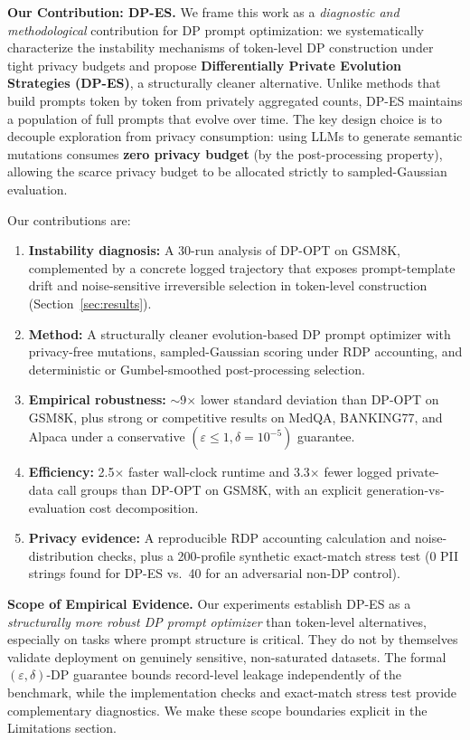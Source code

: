




\noindent\textbf{Our Contribution: DP-ES.}
We frame this work as a \emph{diagnostic and methodological} contribution for DP prompt optimization: we systematically characterize the instability mechanisms of token-level DP construction under tight privacy budgets and propose \textbf{Differentially Private Evolution Strategies (DP-ES)}, a structurally cleaner alternative. Unlike methods that build prompts token by token from privately aggregated counts, DP-ES maintains a population of full prompts that evolve over time. The key design choice is to decouple exploration from privacy consumption: using LLMs to generate semantic mutations consumes \textbf{zero privacy budget} (by the post-processing property), allowing the scarce privacy budget to be allocated strictly to sampled-Gaussian evaluation.

Our contributions are:
\vspace{-0.3em}
\begin{enumerate}[leftmargin=*,itemsep=-0.3em]
    \item \textbf{Instability diagnosis:} A 30-run analysis of DP-OPT on GSM8K, complemented by a concrete logged trajectory that exposes prompt-template drift and noise-sensitive irreversible selection in token-level construction (Section~\ref{sec:results}).
    \item \textbf{Method:} A structurally cleaner evolution-based DP prompt optimizer with privacy-free mutations, sampled-Gaussian scoring under RDP accounting, and deterministic or Gumbel-smoothed post-processing selection.
    \item \textbf{Empirical robustness:} $\sim$9$\times$ lower standard deviation than DP-OPT on GSM8K, plus strong or competitive results on MedQA, BANKING77, and Alpaca under a conservative $(\varepsilon{\leq}1,\delta{=}10^{-5})$ guarantee.
    \item \textbf{Efficiency:} 2.5$\times$ faster wall-clock runtime and 3.3$\times$ fewer logged private-data call groups than DP-OPT on GSM8K, with an explicit generation-vs-evaluation cost decomposition.
    \item \textbf{Privacy evidence:} A reproducible RDP accounting calculation and noise-distribution checks, plus a 200-profile synthetic exact-match stress test (0 PII strings found for DP-ES vs.\ 40 for an adversarial non-DP control).
\end{enumerate}

\noindent\textbf{Scope of Empirical Evidence.}
Our experiments establish DP-ES as a \emph{structurally more robust DP prompt optimizer} than token-level alternatives, especially on tasks where prompt structure is critical. They do not by themselves validate deployment on genuinely sensitive, non-saturated datasets. The formal $(\varepsilon,\delta)$-DP guarantee bounds record-level leakage independently of the benchmark, while the implementation checks and exact-match stress test provide complementary diagnostics. We make these scope boundaries explicit in the Limitations section.
